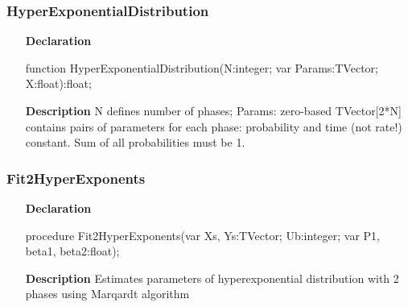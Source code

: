 \documentclass[12pt,a4paper,oneside]{report}
\newcommand{\declarationitem}[1]{\textbf{#1}}
\newcommand{\descriptiontitle}[1]{\textbf{#1}}
\begin{document}
\subsubsection{HyperExponentialDistribution}
\label{udistribs-HyperExponentialDistribution}
\begin{itemize}\item[\declarationitem{Declaration}\hfill]
	\begin{flushleft}
		\begin{ttfamily}
			function HyperExponentialDistribution(N:integer; var Params:TVector; X:float):float;\end{ttfamily}
		
	\end{flushleft}
	
	\par
	\item[\descriptiontitle{Description}]
	N defines number of phases; Params: zero-based TVector[2*N] contains pairs of parameters for each phase: probability and time (not rate!) constant. Sum of all probabilities must be 1.
	
\end{itemize}
\subsubsection{Fit2HyperExponents}
\label{udistribs-Fit2HyperExponents}
\begin{itemize}\item[\declarationitem{Declaration}\hfill]
	\begin{flushleft}
		\begin{ttfamily}
			procedure Fit2HyperExponents(var Xs, Ys:TVector; Ub:integer; var P1, beta1, beta2:float);\end{ttfamily}
		
	\end{flushleft}
	
	\par
	\item[\descriptiontitle{Description}]
	Estimates parameters of hyperexponential distribution with 2 phases using Marqardt algorithm
	
\end{itemize}
\end{document}
